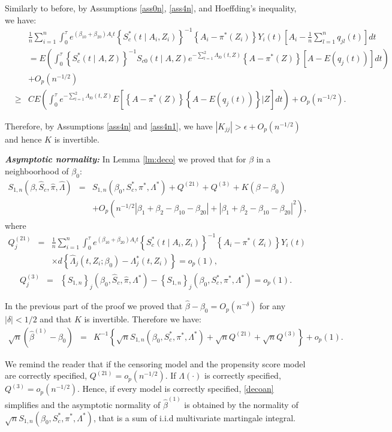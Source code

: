 \documentclass[11pt]{article}
\newcommand{\ee}{\end{eqnarray}}
\newcommand{\eqnn}{\begin{eqnarray*}}
\newcommand{\een}{\end{eqnarray*}}
\newcommand{\be}{\begin{eqnarray}}
\begin{document}
Similarly to before, by Assumptions \ref{ass0n}, \ref{ass4n}, and Hoeffding's inequality, we have:
\eqnn
&&\frac{1}{n}\sum_{i=1}^n\int_0^\tau e^{ (\beta_{10}  + \beta_{20}) A_i t}\left\{S^{*}_c(t \mid A_i,Z_i)\right\}^{-1}\left\{A_i -\pi^{*}( Z_i)\right\}Y_i(t)\left[A_i-\frac{1}{n}\sum_{l=1}^nq_{jl}(t)\right]dt\\
&&=E\left(\int_0^{\tau} \left\{S^{*}_c(t \mid A,Z)\right\}^{-1}S_{c0}(t \mid A,Z)e^{-\sum_{l=1}^2\Lambda_{l0}(t,Z)}\left\{A -\pi^{*}( Z)\right\}\left[A-E(q_j(t))\right]dt\right)\\&&+O_p(n^{-1/2})\nonumber\\
&\geq&CE\left(\int_0^{\tau}e^{-\sum_{l=1}^2\Lambda_{l0}(t,Z)}E\left[\left\{A -\pi^{*}( Z)\right\}\left\{A-E(q_j(t))\right\} | Z\right]dt\right)+O_p(n^{-1/2}).\nonumber
\een

Therefore, by Assumptions \ref{ass4n} and \ref{ass4n1}, we have $\left|{K}_{jj}\right|>\epsilon+O_p(n^{-1/2})$ and hence ${K}$ is invertible.





\textbf{\emph{Asymptotic normality:}}
In Lemma \ref{lm:deco} we proved that for $\beta$ in a neighboorhood of $\beta_0$:
\eqnn
{S}_{1,n}(\beta, \hat S_c,  \hat \pi, \hat \Lambda)&=&{S}_{1,n}(\beta_0, S^{*}_c,  \pi^{*}, \Lambda^{*})+Q^{(21)}+Q^{(3)}+{K}({\beta}-{\beta}_0)\\
&&+O_p\left(n^{-1/2}\left|\beta_1+\beta_2-\beta_{10}-\beta_{20}\right|+\left|\beta_1+\beta_2-\beta_{10}-\beta_{20}\right|^2\right),
\een
where
\eqnn
Q^{(21)}_j&=&\frac{1}{n}\sum_{i=1}^n\int_0^\tau e^{ (\beta_{10}  + \beta_{20}) A_i t}\left\{S^{*}_c(t \mid A_i,Z_i)\right\}^{-1}\left\{A_i -\pi^{*}( Z_i)\right\}Y_i(t)\nonumber
\\
&&\times d\left\{\hat \Lambda_{j}(t, Z_i ; \beta_0)-\Lambda^{*}_{j}(t, Z_i)\right\}=o_p(1),\een
\eqnn
Q^{(3)}_j&=&\left\{{S}_{1,n}\right\}_j(\beta_0, \hat S_c,  \hat \pi, \Lambda^{*})-\left\{{S}_{1,n}\right\}_j(\beta_0, S^{*}_c,  \pi^{*}, \Lambda^{*})=o_p(1).\een


In the previous part of the proof we proved that $\hat{{\beta}} -{\beta}_0=O_p(n^{-\delta})$ for any $|\delta|<1/2$ and that ${K}$ is invertible. Therefore we have:
\be\label{decoan}
\sqrt{n}(\hat \beta^{(1)}-{\beta}_{0})&=&{K}^{-1}\left\{\sqrt{n}{S}_{1,n}(\beta_0, S^{*}_c,  \pi^{*}, \Lambda^{*})+\sqrt{n}Q^{(21)}+\sqrt{n}Q^{(3)}\right\}+o_p(1).\ee

We remind the reader that if the censoring model and the propensity score model are correctly specified, $Q^{(21)}=o_p(n^{-1/2})$. If $\Lambda(\cdot)$ is correctly specified, $Q^{(3)}=o_p(n^{-1/2})$.
Hence, if every model is correctly specified, \eqref{decoan} simplifies and the asymptotic normality of $\hat \beta^{(1)}$ is obtained by the normality of $\sqrt{n}{S}_{1,n}(\beta_0, S^{*}_c,  \pi^{*}, \Lambda^{*})$, that is a sum of i.i.d multivariate martingale integral.
\end{document}
